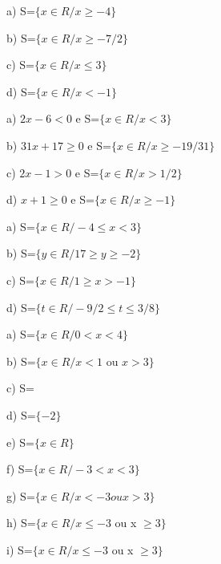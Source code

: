 \begin{respostas}{3}
    \ansitem{}
    a) S=$ \{ x \in R / x \geq -4 \} $

    b) S=$ \{ x \in R / x \geq -7/2 \} $

    c) S=$ \{ x \in R / x \leq  3 \} $
    
    d) S=$ \{ x \in R / x < -1\} $


    \ansitem{}
    a) $2x - 6 < 0$ e S=$\{x \in R / x < 3 \}$

    b) $31x + 17 \geq 0$ e S=$ \{x \in R / x \geq -19/31 \} $

    c) $2x - 1 > 0$ e S=$ \{ x \in R / x > 1/2 \} $

    d) $x + 1 \geq 0$ e S=$ \{ x \in R / x \geq -1 \} $

    \ansitem{}
    a) S=$ \{ x \in R / -4 \leq x < 3  \} $

    b) S=$ \{ y \in R / 17 \geq y \geq -2 \} $

    c) S=$ \{ x \in R / 1 \geq x > -1  \} $

    d) S=$ \{ t \in R / -9/2 \leq t \leq 3/8 \} $
\end{respostas}

\begin{respostas}{4}
    \ansitem{}
    a) S=$ \{ x \in R / 0 < x < 4 \}$

    b) S=$ \{ x \in  R / x < 1$ ou $x > 3 \}$

    c) S=

    d) S=$ \{ -2 \} $

    e) S=$ \{ x \in R \} $ 

    f) S=$ \{ x \in R / -3 < x < 3 \}$

    g) S=$ \{ x \in R / x< -3 ou x> 3 \} $

    h) S=$ \{ x \in R / x \leq -3$ ou x $\geq 3 \} $

    i) S=$ \{ x \in R / x \leq -3$ ou x $\geq 3 \} $
\end{respostas}